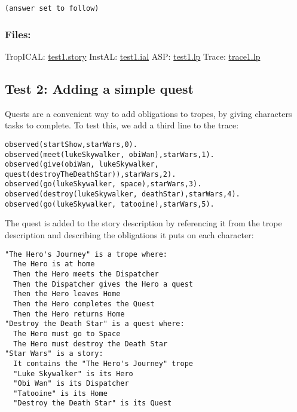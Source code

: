 \documentclass[11pt]{article}
\begin{document}
\begin{verbatim}
(answer set to follow)
\end{verbatim}


\subsubsection{Files:}
\label{sec:orgheadline1}
TropICAL: \href{file://c:/Users/Matthew/Dropbox/clojure/tropic/resources/test1.story}{test1.story} 
InstAL: \href{file://c:/Users/Matthew/Dropbox/clojure/tropic/resources/test1.ial}{test1.ial}
ASP: \href{file://c:/Users/Matthew/Dropbox/clojure/tropic/resources/test1.lp}{test1.lp}
Trace: \href{file://c:/Users/Matthew/Dropbox/clojure/tropic/resources/trace1.lp}{trace1.lp}

\subsection{Test 2: Adding a simple quest}
\label{sec:orgheadline3}

Quests are a convenient way to add obligations to tropes, by giving characters tasks to complete. To test this, we add a third line to the trace:

\begin{verbatim}
observed(startShow,starWars,0).
observed(meet(lukeSkywalker, obiWan),starWars,1).
observed(give(obiWan, lukeSkywalker, quest(destroyTheDeathStar)),starWars,2).
observed(go(lukeSkywalker, space),starWars,3).
observed(destroy(lukeSkywalker, deathStar),starWars,4).
observed(go(lukeSkywalker, tatooine),starWars,5).
\end{verbatim}

The quest is added to the story description by referencing it from the trope description and describing the obligations it puts on each character:

\begin{verbatim}
"The Hero's Journey" is a trope where:
  The Hero is at home
  Then the Hero meets the Dispatcher
  Then the Dispatcher gives the Hero a quest
  Then the Hero leaves Home
  Then the Hero completes the Quest
  Then the Hero returns Home
"Destroy the Death Star" is a quest where:
  The Hero must go to Space
  The Hero must destroy the Death Star
"Star Wars" is a story:
  It contains the "The Hero's Journey" trope
  "Luke Skywalker" is its Hero
  "Obi Wan" is its Dispatcher
  "Tatooine" is its Home
  "Destroy the Death Star" is its Quest
\end{verbatim}
\end{document}
